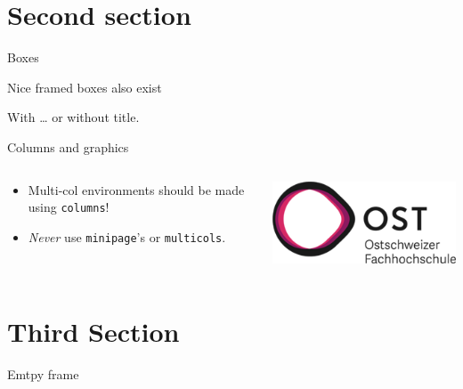 \documentclass[aspectratio=169, arial]{beamer}    %
\begin{document}
\section{Second section}
\begin{frame}{Boxes}
    \begin{ostbox}{}
        Nice framed boxes also exist
    \end{ostbox}
    \begin{ostbox}{With \dots}
        or without title.
    \end{ostbox}
\end{frame}
\begin{frame}{Columns and graphics}
    \begin{columns}[onlytextwidth]
        \begin{column}{0.5\textwidth}
            \begin{itemize}
                \item Multi-col environments should be made using \texttt{columns}!
                \item \emph{Never} use \texttt{minipage}'s or \texttt{multicols}.
            \end{itemize}
        \end{column}
        \begin{column}{0.5\textwidth}
            \centering
            \includegraphics[width=0.8\linewidth]{header/ost_logo}
        \end{column}
    \end{columns}
\end{frame}

\section{Third Section}
\begin{frame}
	Emtpy frame
\end{frame}
\end{document}
